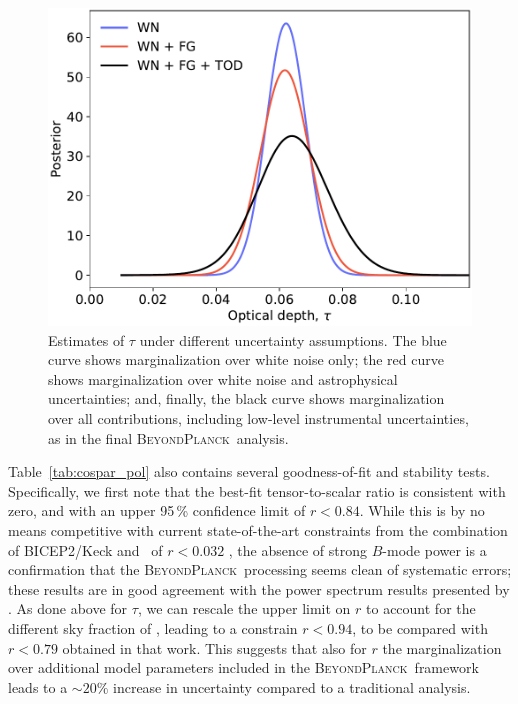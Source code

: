 \documentclass[twocolumn]{aa}
\newcommand{\BP}{\textsc{BeyondPlanck}}
\begin{document}
\begin{figure}[t]
	\center
	\includegraphics[width=\linewidth]{figs/BP10_tau_syst_assess.pdf}
        \caption{Estimates of $\tau$ under different uncertainty
          assumptions. The blue curve shows marginalization over white
          noise only; the red 
          curve shows marginalization over white noise and
          astrophysical uncertainties; and, finally, the black curve
          shows marginalization over all contributions, including
          low-level instrumental uncertainties, as in the
          final \BP\ analysis.}
	\label{fig:tau_assess}
\end{figure}


Table~\ref{tab:cospar_pol} also contains several goodness-of-fit and
stability tests. Specifically, we first note that the best-fit
tensor-to-scalar ratio is consistent with zero, and with an upper
95\,\% confidence limit of $r<0.84$. While this is by no means
competitive with current state-of-the-art constraints from the
combination of BICEP2/Keck and \Planck\ of $r<0.032$
\citep{tristram:2021}, the absence of strong $B$-mode power is a
confirmation that the \BP\ processing seems clean of systematic
errors; these results are in good agreement with the power spectrum
results presented by \citet{bp11}. As done above for $\tau$, 
we can rescale the upper limit on $r$ to account for the different sky 
fraction of \cite{natale:2020}, leading to a constrain $r<0.94$, 
to be compared with $r<0.79$ obtained in that work. This suggests that 
also for $r$ the marginalization over additional model parameters 
included in the \BP\ framework leads to a $\sim 20\%$ increase in 
uncertainty compared to a traditional analysis. 
\end{document}
